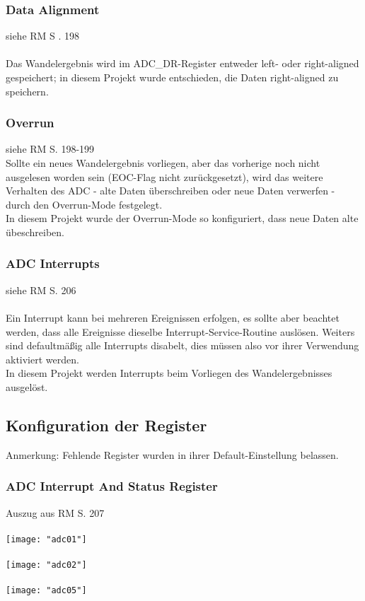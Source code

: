 \documentclass[11pt]{report}
\begin{document}
			\subsubsection{Data Alignment}
				siehe RM S . 198\\
				\\Das Wandelergebnis wird im ADC\_DR-Register entweder left- oder right-aligned gespeichert; in diesem Projekt wurde entschieden, die Daten right-aligned zu speichern.
			\subsubsection{Overrun}
				siehe RM S. 198-199\\
				Sollte ein neues Wandelergebnis vorliegen, aber das vorherige noch nicht ausgelesen worden sein (EOC-Flag nicht zurückgesetzt), wird das weitere Verhalten des ADC  - alte Daten überschreiben oder neue Daten verwerfen - durch den Overrun-Mode festgelegt.\\
				In diesem Projekt wurde der Overrun-Mode so konfiguriert, dass neue Daten alte übeschreiben.
			\subsubsection{ADC Interrupts}
				siehe RM S. 206\\
				\\Ein Interrupt kann bei mehreren Ereignissen erfolgen, es sollte aber beachtet werden, dass alle Ereignisse dieselbe Interrupt-Service-Routine auslösen. Weiters sind defaultmäßig alle Interrupts disabelt, dies müssen also vor ihrer Verwendung aktiviert werden.\\
				In diesem Projekt werden Interrupts beim Vorliegen des Wandelergebnisses ausgelöst.
		\subsection{Konfiguration der Register}
			Anmerkung: Fehlende Register wurden in ihrer Default-Einstellung belassen.
			\subsubsection{ADC Interrupt And Status Register}
				Auszug aus RM S. 207\\
				\\\texttt{[image: "adc01"]}\\
				\\\texttt{[image: "adc02"]}\\
				\\\texttt{[image: "adc05"]}\\
\end{document}
